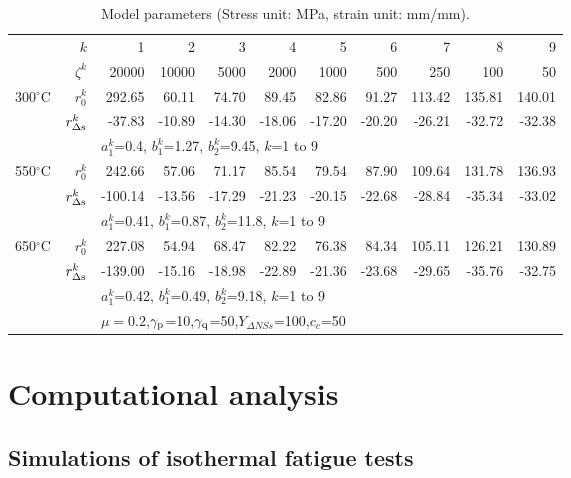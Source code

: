 \documentclass[preprint,5p,twocolumn,11pt,sort&compress]{elsarticle}
\begin{document}
\begin{table*}[htbp]
  \centering
  \caption{Model parameters (Stress unit: MPa, strain unit: mm/mm).}
    \begin{tabular}{rrrrrrrrrrr}
    \hline
          & $k$   & 1     & 2     & 3     & 4     & 5     & 6     & 7     & 8     & 9 \\
          & $\zeta^k$ & 20000 & 10000 & 5000  & 2000  & 1000  & 500   & 250   & 100   & 50 \\
    \hline
    300$^{\circ}$C & $r_0^k$ & 292.65  & 60.11  & 74.70  & 89.45  & 82.86  & 91.27  & 113.42  & 135.81  & 140.01  \\
          & $r_{\Delta \rm s}^k$ & -37.83  & -10.89  & -14.30  & -18.06  & -17.20  & -20.20  & -26.21  & -32.72  & -32.38  \\
          & & \multicolumn{9}{l}{$a_1^k$=0.4, $b_1^k$=1.27, $b_2^k$=9.45, $k$=1 to 9} \\
    \hline
    550$^{\circ}$C & $r_0^k$ & 242.66  & 57.06  & 71.17  & 85.54  & 79.54  & 87.90  & 109.64  & 131.78  & 136.93  \\
          & $r_{\Delta \rm s}^k$ & -100.14  & -13.56  & -17.29  & -21.23  & -20.15  & -22.68  & -28.84  & -35.34  & -33.02  \\
          & & \multicolumn{9}{l}{$a_1^k$=0.41, $b_1^k$=0.87, $b_2^k$=11.8, $k$=1 to 9} \\
    \hline
    650$^{\circ}$C & $r_0^k$ & 227.08  & 54.94  & 68.47  & 82.22  & 76.38  & 84.34  & 105.11  & 126.21  & 130.89  \\
          & $r_{\Delta \rm s}^k$ & -139.00  & -15.16  & -18.98  & -22.89  & -21.36  & -23.68  & -29.65  & -35.76  & -32.75  \\
          & & \multicolumn{9}{l}{$a_1^k$=0.42, $b_1^k$=0.49, $b_2^k$=9.18, $k$=1 to 9} \\
    \hline
          & & \multicolumn{9}{l}{$\mu=0.2$,$\gamma_{\rm p}$=10,$\gamma_{\rm q}$=50,$Y_{\Delta NSs}$=100,$c_c$=50} \\
    \hline
    \end{tabular}%
  \label{tab:3}%
\end{table*}%

\section{Computational analysis}

\subsection{Simulations of isothermal fatigue tests}
\end{document}
